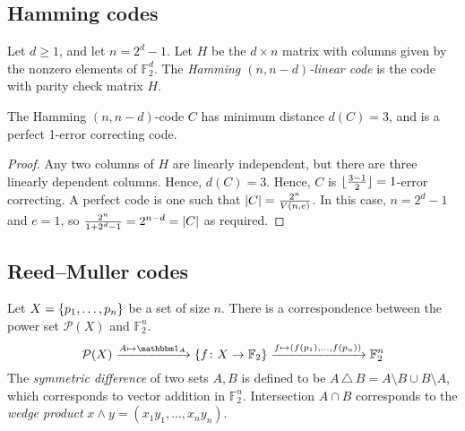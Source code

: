 \subsection{Hamming codes}
\begin{definition}
    Let \( d \geq 1 \), and let \( n = 2^d - 1 \).
    Let \( H \) be the \( d \times n \) matrix with columns given by the nonzero elements of \( \mathbb F_2^d \).
    The \emph{Hamming \( (n, n-d) \)-linear code} is the code with parity check matrix \( H \).
\end{definition}
\begin{lemma}
    The Hamming \( (n, n-d) \)-code \( C \) has minimum distance \( d(C) = 3 \), and is a perfect 1-error correcting code.
\end{lemma}
\begin{proof}
    Any two columns of \( H \) are linearly independent, but there are three linearly dependent columns.
    Hence, \( d(C) = 3 \).
    Hence, \( C \) is \( \lfloor\frac{3-1}{2}\rfloor = 1 \)-error correcting.
    A perfect code is one such that \( \abs{C} = \frac{2^n}{V(n,e)} \).
    In this case, \( n = 2^d - 1 \) and \( e = 1 \), so \( \frac{2^n}{1 + 2^d - 1} = 2^{n-d} = \abs{C} \) as required.
\end{proof}

\subsection{Reed--Muller codes}
Let \( X = \qty{p_1, \dots, p_n} \) be a set of size \( n \).
There is a correspondence between the power set \( \mathcal P(X) \) and \( \mathbb F_2^n \).
\[ \mathcal P(X) \xrightarrow{A \mapsto \mathbbm 1_A} \qty{f \colon X \to \mathbb F_2} \xrightarrow{f \mapsto (f(p_1), \dots, f(p_n))} \mathbb F_2^n \]
The \emph{symmetric difference} of two sets \( A, B \) is defined to be \( A \,\triangle\, B = A\setminus B \cup B \setminus A \), which corresponds to vector addition in \( \mathbb F_2^n \).
Intersection \( A \cap B \) corresponds to the \emph{wedge product} \( x \wedge y = (x_1 y_1, \dots, x_n y_n) \).

